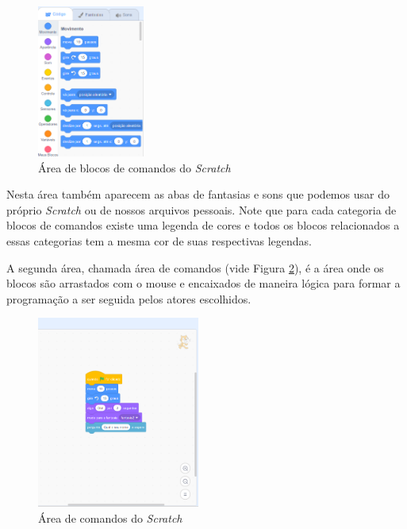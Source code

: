 \documentclass[12pt, openright, a4paper, brazil, english, french, spanish, bibjustif, openany, oneside]{abntex2}
\begin{document}
\begin{figure}[H]

    \center
    \caption{Área de blocos de comandos do \textit{Scratch} \label{scr2}}
    \includegraphics[height=5cm]{scratch2.png}
    
\end{figure}


Nesta área também aparecem as abas de fantasias e sons que podemos usar do próprio \textit{Scratch} ou de nossos arquivos pessoais. Note que para cada categoria de blocos de comandos existe uma legenda de cores e todos os blocos relacionados a essas categorias tem a mesma cor de suas respectivas legendas.

A segunda área, chamada área de comandos (vide Figura \ref{scr3}), é a área onde os blocos são arrastados com o mouse e encaixados de maneira lógica para formar a programação a ser seguida pelos atores escolhidos.

\begin{figure}[H]

    \center
    \caption{Área de comandos do \textit{Scratch} \label{scr3}}
    \includegraphics[height=6.3cm]{scratch3.png}
    
\end{figure}
\end{document}

